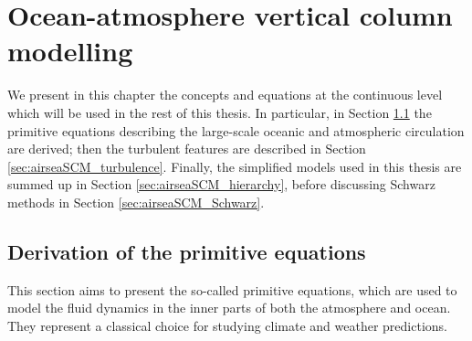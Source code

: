 \chapter{Ocean-atmosphere vertical column modelling}
\label{ch:airseaSCM}
\minitoc
We present in this chapter the concepts and equations at
the continuous level which
will be used in the rest of this thesis.
In particular, in Section \ref{sec:airseaSCM_primitiveEquations}
the primitive equations describing the large-scale
oceanic and atmospheric circulation are derived; then
the turbulent features are described in Section
\ref{sec:airseaSCM_turbulence}.
Finally, the simplified models used in this thesis are summed up
in Section \ref{sec:airseaSCM_hierarchy},
before discussing Schwarz methods in Section
\ref{sec:airseaSCM_Schwarz}.
\section{Derivation of the primitive equations}
\label{sec:airseaSCM_primitiveEquations}
This section aims to present the so-called
primitive equations, which are used to model the fluid dynamics
in the inner parts of both the atmosphere and ocean. They represent
a classical choice for studying climate and weather predictions.

